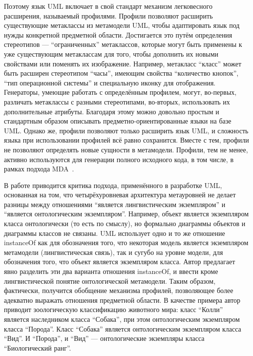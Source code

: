 Поэтому язык UML включает в свой стандарт механизм легковесного расширения, называемый 
профилями. Профили позволяют расширить существующие метаклассы из метамодели UML, 
чтобы адаптировать язык под нужды конкретной предметной области. Достигается это путём 
определения стереотипов --- "`ограниченных"' метаклассов, которые могут быть применены 
к уже существующим метаклассам для того, чтобы дополнить их новыми свойствами или 
поменять их изображение. Например, метакласс "`класс"' может быть расширен стереотипом 
"`часы"', имеющим свойства "`количество кнопок"', "`тип операционной системы"' и специальную 
иконку для отображения. Генераторы, умеющие работать с определённым профилем, могут, 
во-первых, различать метаклассы с разными стереотипами, во-вторых, использовать их 
дополнительные атрибуты. Благодаря этому можно довольно простым и стандартным образом 
описывать предметно-ориентированные языки на базе UML. Однако же, профили позволяют 
только расширить язык UML, и сложность языка при использовании профилей всё равно 
сохранится. Вместе с тем, профили не позволяют определять новые сущности в метамодели. 
Профили, тем не менее, активно используются для генерации полного исходного кода, 
в том числе, в рамках подхода MDA~\cite{swithinbank2005patterns}.

В работе \cite{atkinson2003model} приводится критика подхода, применённого в разработке UML, 
основанная на том, что четырёхуровневая архитектура метауровней не делает разницы между отношениями 
"`является лингвистическим экземпляром"' и "`является онтологическим экземпляром"'. 
Например, объект является экземпляром класса онтологически (то есть по смыслу), но 
формально диаграммы объектов и диаграммы классов не связаны. UML использует одно и 
то же отношение instanceOf как для обозначения того, что некоторая модель является 
экземпляром метамодели (лингвистическая связь), так и сугубо на уровне модели, для 
обозначения того, что объект является экземпляром класса. Автор предлагает явно разделить 
эти два варианта отношения instanceOf, и ввести кроме лингвистической понятие онтологической 
метамодели. Таким образом, фактически, получится обобщение механизма профилей, позволяющее
более адекватно выражать отношения предметной области. В качестве примера автор приводит 
зоологическую классификацию животного мира: класс "`Колли"' является наследником класса 
"`Собака"', при этом онтологическим экземпляром класса "`Порода"'. Класс "`Собака"' 
является онтологическим экземпляром класса "`Вид"'. И "`Порода"', и "`Вид"' --- онтологические 
экземпляры класса "`Биологический ранг"'.

